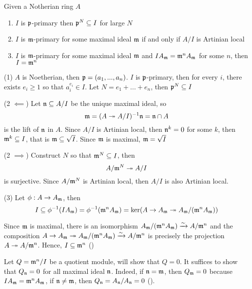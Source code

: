 \begin{lemma}
	Given a Notherian ring $A$
	\begin{enumerate}
		\item $I$ is $\mathfrak{p}$-primary then $\mathfrak{p}^N \subseteq I$ for large $N$
		\item $I$ is $\mathfrak{m}$-primary for some maximal ideal $\mathfrak{m}$ if and only if $A / I$ is Artinian local
		\item $I$ is $\mathfrak{m}$-primary for some maximal ideal $\mathfrak{m}$ and $I A_{\mathfrak{m}} = \mathfrak{m}^n A_{\mathfrak{m}}$ for some $n$, then $I = \mathfrak{m}^n$
	\end{enumerate}
\end{lemma}

\begin{longproof}
	(1) $A$ is Noetherian, then $\mathfrak{p} = (a_1, ..., a_n)$. $I$ is $\mathfrak{p}$-primary, then for every $i$, there exists $e_i \geq 1$ so that $a_i^{e_i} \in I$. Let $N = e_1 + ... + e_n$, then $\mathfrak{p}^N \subseteq I$
	
	(2 $\impliedby$) Let $\mathfrak{n} \subseteq A / I$ be the unique maximal ideal, so 
	$$
		\mathfrak{m} = (A \twoheadrightarrow A / I)^{-1} \mathfrak{n} = \mathfrak{n} \cap A
	$$
	is the lift of $\mathfrak{n}$ in $A$. Since $A / I$ is Artinian local, then $\mathfrak{n}^k = 0$ for some $k$, then $\mathfrak{m}^k \subseteq I$, that is $\mathfrak{m} \subseteq \sqrt{I}$. Since $\mathfrak{m}$ is maximal, $\mathfrak{m} = \sqrt{I}$
	
	(2 $\implies$) Construct $N$ so that $\mathfrak{m}^N \subseteq I$, then 
	$$
		A / \mathfrak{m}^N \twoheadrightarrow A / I
	$$
	is surjective. Since $A / \mathfrak{m}^N$ is Artinian local, then $A / I$ is also Artinian local.
	
	(3) Let $\phi: A \to A_{\mathfrak{m}}$, then 
	$$
		I \subseteq \phi^{-1}(I A_{\mathfrak{m}}) = \phi^{-1}(\mathfrak{m}^n A_{\mathfrak{m}}) = \ker (A \to A_{\mathfrak{m}} \twoheadrightarrow A_{\mathfrak{m}} / (\mathfrak{m}^n A_{\mathfrak{m}}))
	$$
	
	Since $\mathfrak{m}$ is maximal, there is an isomorphism $A_{\mathfrak{m}} / (\mathfrak{m}^n A_{\mathfrak{m}}) \xrightarrow{\sim} A / \mathfrak{m}^n$ and the composition $A \to A_{\mathfrak{m}} \twoheadrightarrow A_{\mathfrak{m}} / (\mathfrak{m}^n A_{\mathfrak{m}}) \xrightarrow{\sim} A / \mathfrak{m}^n$ is precisely the projection $A \twoheadrightarrow A / \mathfrak{m}^n$. Hence, $I \subseteq \mathfrak{m}^n$ ()
	
	Let $Q = \mathfrak{m}^n / I$ be a quotient module, will show that $Q = 0$. It suffices to show that $Q_{\mathfrak{n}} = 0$ for all maximal ideal $\mathfrak{n}$. Indeed, if $\mathfrak{n} =  \mathfrak{m}$, then $Q_{\mathfrak{m}} = 0$ because $I A_{\mathfrak{m}}  = \mathfrak{m}^n A_{\mathfrak{m}}$, if $\mathfrak{n} \neq  \mathfrak{m}$, then $Q_{\mathfrak{n}} = A_{\mathfrak{n}} / A_{\mathfrak{n}} = 0$ ().
\end{longproof}

